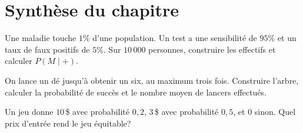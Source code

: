 \section*{Synthèse du chapitre}
\begin{synthesisbox}
\item Une maladie touche $1\%$ d'une population. Un test a une sensibilité de $95\%$ et un taux de faux positifs de $5\%$. Sur $10\,000$ personnes, construire les effectifs et calculer $P(M\mid+)$.
\item On lance un dé jusqu'à obtenir un six, au maximum trois fois. Construire l'arbre, calculer la probabilité de succès et le nombre moyen de lancers effectués.
\item Un jeu donne $10\,$\$ avec probabilité $0{,}2$, $3\,$\$ avec probabilité $0{,}5$, et $0$ sinon. Quel prix d'entrée rend le jeu équitable?
\end{synthesisbox}
